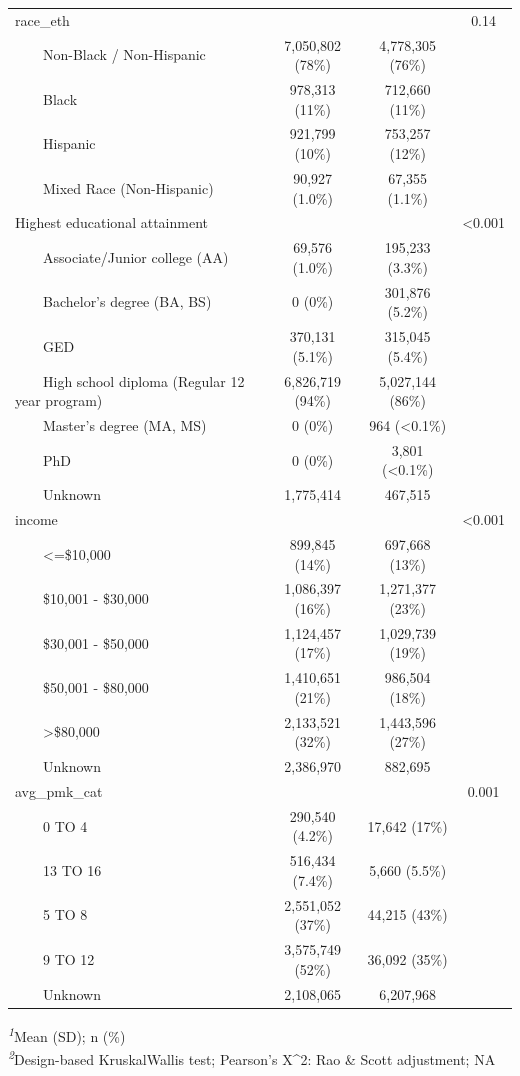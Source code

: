 \documentclass[
]{article}
\begin{document}
\begin{table}[t]
\begin{tabular*}{\linewidth}{@{\extracolsep{\fill}}lccc}
race\_eth &  &  & 0.14 \\ 
    Non-Black / Non-Hispanic & 7,050,802 (78\%) & 4,778,305 (76\%) &  \\ 
    Black & 978,313 (11\%) & 712,660 (11\%) &  \\ 
    Hispanic & 921,799 (10\%) & 753,257 (12\%) &  \\ 
    Mixed Race (Non-Hispanic) & 90,927 (1.0\%) & 67,355 (1.1\%) &  \\ 
Highest educational attainment &  &  & <0.001 \\ 
    Associate/Junior college (AA) & 69,576 (1.0\%) & 195,233 (3.3\%) &  \\ 
    Bachelor's degree (BA, BS) & 0 (0\%) & 301,876 (5.2\%) &  \\ 
    GED & 370,131 (5.1\%) & 315,045 (5.4\%) &  \\ 
    High school diploma (Regular 12 year program) & 6,826,719 (94\%) & 5,027,144 (86\%) &  \\ 
    Master's degree (MA, MS) & 0 (0\%) & 964 (<0.1\%) &  \\ 
    PhD & 0 (0\%) & 3,801 (<0.1\%) &  \\ 
    Unknown & 1,775,414 & 467,515 &  \\ 
income &  &  & <0.001 \\ 
    <=\$10,000 & 899,845 (14\%) & 697,668 (13\%) &  \\ 
    \$10,001 - \$30,000 & 1,086,397 (16\%) & 1,271,377 (23\%) &  \\ 
    \$30,001 - \$50,000 & 1,124,457 (17\%) & 1,029,739 (19\%) &  \\ 
    \$50,001 - \$80,000 & 1,410,651 (21\%) & 986,504 (18\%) &  \\ 
    >\$80,000 & 2,133,521 (32\%) & 1,443,596 (27\%) &  \\ 
    Unknown & 2,386,970 & 882,695 &  \\ 
avg\_pmk\_cat &  &  & 0.001 \\ 
    0 TO 4 & 290,540 (4.2\%) & 17,642 (17\%) &  \\ 
    13 TO 16 & 516,434 (7.4\%) & 5,660 (5.5\%) &  \\ 
    5 TO 8 & 2,551,052 (37\%) & 44,215 (43\%) &  \\ 
    9 TO 12 & 3,575,749 (52\%) & 36,092 (35\%) &  \\ 
    Unknown & 2,108,065 & 6,207,968 &  \\ 
\bottomrule
\end{tabular*}
\begin{minipage}{\linewidth}
\textsuperscript{\textit{1}}Mean (SD); n (\%)\\
\textsuperscript{\textit{2}}Design-based KruskalWallis test; Pearson's X\^{}2: Rao \& Scott adjustment; NA\\
\end{minipage}
\end{table}
\end{document}
